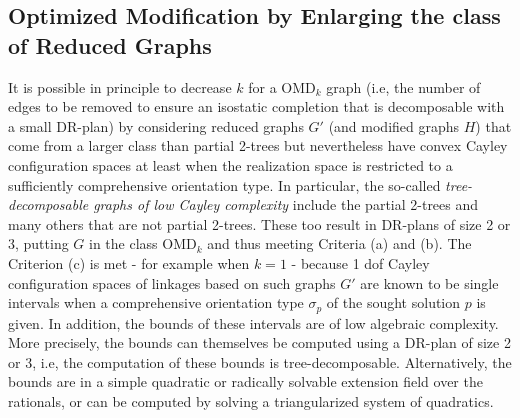\subsection{Optimized Modification by Enlarging the class of Reduced
Graphs}
\label{tdecomp}
It is possible in principle to decrease $k$ for a OMD$_k$ graph
(i.e, the number of edges to be removed
to ensure an isostatic completion that is decomposable with a small DR-plan) by
considering reduced graphs $G'$ (and modified graphs $H$) that come from a larger class than
partial 2-trees but nevertheless have convex Cayley configuration spaces at
least when the realization space is restricted to a sufficiently
comprehensive orientation type.
In particular, the so-called {\em tree-decomposable graphs of low Cayley
complexity} \cite{XX} include the partial 2-trees and many others that are
not partial 2-trees. These too result in DR-plans of size 2 or 3, putting $G$ in the class
OMD$_k$ and thus meeting Criteria (a) and (b). The Criterion (c) is met
- for example when $k=1$ -  because 1 dof Cayley configuration spaces of
linkages based on such graphs $G'$
are known to be single intervals
when a comprehensive orientation type $\sigma_p$ of the sought solution $p$ is given.
In addition, the bounds of these intervals are of low algebraic
complexity.
More precisely, the bounds  can themselves be computed using a DR-plan of size 2 or 3,
i.e, the computation of these bounds is tree-decomposable. Alternatively,
the bounds are in a simple quadratic or radically solvable extension field over the rationals,
or can be computed by solving a
triangularized system of quadratics.
